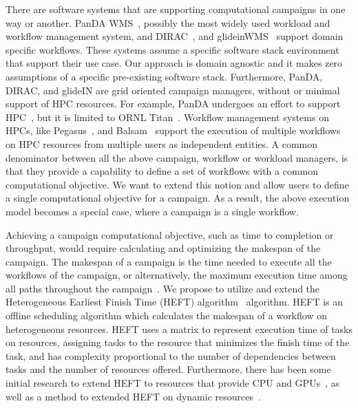 There are software systems that are supporting computational campaigns in one way or another. 
PanDA WMS~\cite{maeno2008panda,maeno2014evolution}, possibly the most widely used workload and workflow management system, and DIRAC~\cite{casajus2010dirac}, and glideinWMS~\cite{sfiligoi2008glidein} support domain specific workflows.
These systems assume a specific software stack environment that support their use case.
Our approach is domain agnostic and it makes zero assumptions of a specific pre-existing software stack. 
Furthermore, PanDA, DIRAC, and glideIN are grid oriented campaign managers, without or minimal support of HPC resources.
For example, PanDA undergoes an effort to support HPC~\cite{de2016accelerating}, but it is limited to ORNL Titan~\cite{titan}.
Workflow management systems on HPCs, like Pegasus~\cite{deelman2015pegasus}, and Balsam~\cite{salim2019balsam} support the execution of multiple workflows on HPC resources from multiple users as independent entities.
A common denominator between all the above campaign, workflow or workload managers, is that they provide a capability to define a set of workflows with a common computational objective.
We want to extend this notion and allow users to define a single computational objective for a campaign.
As a result, the above execution model becomes a special case, where a campaign is a single workflow.

Achieving a campaign computational objective, such as time to completion or throughput, would require calculating and optimizing the makespan of the campaign.
The makespan of a campaign is the time needed to execute all the workflows of the campaign, or alternatively, the maximum execution time among all paths throughout the campaign~\cite{chirkin2017execution}.
We propose to utilize and extend the Heterogeneous Earliest Finish Time (HEFT) algorithm~\cite{topcuoglu2002performance} algorithm.
HEFT is an offline scheduling algorithm which calculates the makespan of a workflow on heterogeneous resources.
HEFT uses a matrix to represent execution time of tasks on resources, assigning tasks to the resource that minimizes the finish time of the task, and has complexity proportional to the number of dependencies between tasks and the number of resources offered.
Furthermore, there has been some initial research to extend HEFT to resources that provide CPU and GPUs~\cite{shetti2013optimization}, as well as a method to extended HEFT on dynamic resources~\cite{dong2007pfas}.

